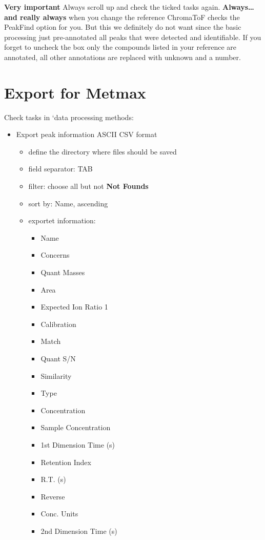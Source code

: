 \documentclass[]{book}
\providecommand{\tightlist}{%
  \setlength{\itemsep}{0pt}\setlength{\parskip}{0pt}}
\begin{document}
\textbf{Very important} Always scroll up and check the ticked tasks again. \textbf{Always\ldots{} and really always} when you change the reference ChromaToF checks the PeakFind option for you. But this we definitely do not want since the basic processing just pre-annotated all peaks that were detected and identifiable. If you forget to uncheck the box only the compounds listed in your reference are annotated, all other annotations are replaced with unknown and a number.

\hypertarget{export-for-metmax}{%
\section{Export for Metmax}\label{export-for-metmax}}

Check tasks in `data processing methods:

\begin{itemize}
\tightlist
\item
  Export peak information ASCII CSV format

  \begin{itemize}
  \tightlist
  \item
    define the directory where files should be saved
  \item
    field separator: TAB
  \item
    filter: choose all but not \textbf{Not Founds}
  \item
    sort by: Name, ascending
  \item
    exportet information:

    \begin{itemize}
    \tightlist
    \item
      Name
    \item
      Concerns
    \item
      Quant Masses
    \item
      Area
    \item
      Expected Ion Ratio 1
    \item
      Calibration
    \item
      Match
    \item
      Quant S/N
    \item
      Similarity
    \item
      Type
    \item
      Concentration
    \item
      Sample Concentration
    \item
      1st Dimension Time (s)
    \item
      Retention Index
    \item
      R.T. (s)
    \item
      Reverse
    \item
      Conc. Units
    \item
      2nd Dimension Time (s)
    \end{itemize}
  \end{itemize}
\end{itemize}
\end{document}
